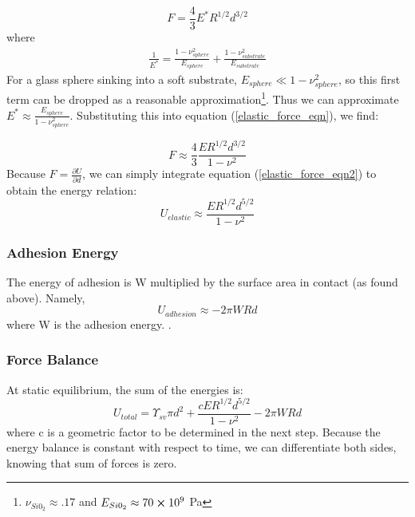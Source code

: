 \begin{equation}
	F = \frac{4}{3}E^*R^{1/2}d^{3/2}
	\label{elastic_force_eqn}
\end{equation} 
where 
\begin{align*}
 \frac{1}{E^*} = \frac{1-\nu_{sphere}^2}{E_{sphere}} + \frac{1-\nu_{substrate}^2}{E_{substrate}} 
\end{align*}
For a glass sphere sinking into a soft substrate, $ E_{sphere} \ll 1-\nu_{sphere}^2 $, so this first term can be dropped as a reasonable approximation\footnote{$\nu_{Si0_2} \approx .17 $ and $ E_{Si0_2} \approx 70 \cross 10^9 $ Pa}. Thus we can approximate $ E^* \approx \frac{E_{sphere}}{1-\nu_{sphere}^2} $. Substituting this into equation (\ref{elastic_force_eqn}), we find:

\begin{equation}
F \approx \frac{4}{3}\frac{ER^{1/2}d^{3/2}}{1-\nu^2}
\label{elastic_force_eqn2}
\end{equation}
Because $F = \frac{\partial U}{\partial d}$, we can simply integrate equation (\ref{elastic_force_eqn2}) to obtain the energy relation:
\begin{equation}
\label{elastic_energy}
U_{elastic} \approx  \frac{ER^{1/2}d^{5/2}}{1-\nu^2}
\end{equation}




\subsubsection{Adhesion Energy}
The energy of adhesion is W multiplied by the surface area in contact (as found above). Namely,
\begin{equation}
\label{W_energy}
U_{adhesion} \approx -2\pi W R d 
\end{equation}
where W is the adhesion energy. . 

\subsubsection{Force Balance}
At static equilibrium, the sum of the energies is:
\[U_{total} = \Upsilon_{sv} \pi d^2 + \frac{cER^{1/2}d^{5/2}}{1-\nu^2} - 2\pi W R d\] 
where c is a geometric factor to be determined in the next step. Because the energy balance is constant with respect to time, we can differentiate both sides, knowing that sum of forces is zero.

